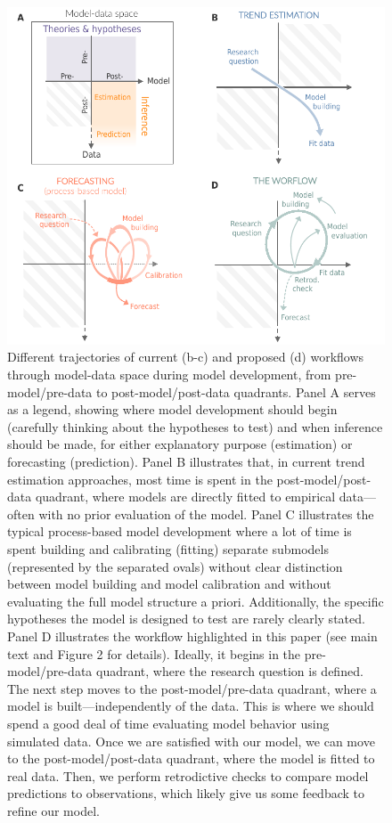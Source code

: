 \documentclass[11pt]{article}
\begin{document}
\begin{figure}
	\centering
	\includegraphics{../../figures/figure_modeldataspaces_revised}
	\caption{Different trajectories of current (b-c) and proposed (d) workflows through model-data space during model development, from pre-model/pre-data to post-model/post-data quadrants.
	Panel A serves as a legend, showing where model development should begin (carefully thinking about the hypotheses to test) and when inference should be made, for either explanatory purpose (estimation) or forecasting (prediction).
	Panel B illustrates that, in current trend estimation approaches, most time is spent in the post-model/post-data quadrant, where models are directly fitted to empirical data---often with no prior evaluation of the model.
	Panel C illustrates the typical process-based model development where a lot of time is spent building and calibrating (fitting) separate submodels (represented by the separated ovals) without clear distinction between model building and model calibration and without evaluating the full model structure a priori. Additionally, the specific hypotheses the model is designed to test are rarely clearly stated.
	Panel D illustrates the workflow highlighted in this paper (see main text and Figure 2 for details). Ideally, it begins in the pre-model/pre-data quadrant, where the research question is defined. The next step moves to the post-model/pre-data quadrant, where a model is built---independently of the data. This is where we should spend a good deal of time evaluating model behavior using simulated data. Once we are satisfied with our model, we can move to the post-model/post-data quadrant, where the model is fitted to real data. Then, we perform retrodictive checks to compare model predictions to observations, which likely give us some feedback to refine our model.}
	\label{fig:modeldata}
\end{figure}
\end{document}
